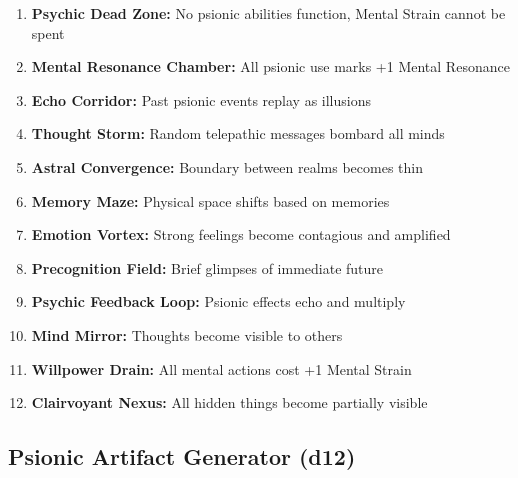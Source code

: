 \documentclass[11pt,twoside]{article}
\begin{document}
\begin{enumerate}[leftmargin=*]
    \item \textbf{Psychic Dead Zone:} No psionic abilities function, Mental Strain cannot be spent
    \item \textbf{Mental Resonance Chamber:} All psionic use marks +1 Mental Resonance
    \item \textbf{Echo Corridor:} Past psionic events replay as illusions
    \item \textbf{Thought Storm:} Random telepathic messages bombard all minds
    \item \textbf{Astral Convergence:} Boundary between realms becomes thin
    \item \textbf{Memory Maze:} Physical space shifts based on memories
    \item \textbf{Emotion Vortex:} Strong feelings become contagious and amplified
    \item \textbf{Precognition Field:} Brief glimpses of immediate future
    \item \textbf{Psychic Feedback Loop:} Psionic effects echo and multiply
    \item \textbf{Mind Mirror:} Thoughts become visible to others
    \item \textbf{Willpower Drain:} All mental actions cost +1 Mental Strain
    \item \textbf{Clairvoyant Nexus:} All hidden things become partially visible
\end{enumerate}

\subsection{Psionic Artifact Generator (d12)}
\end{document}
